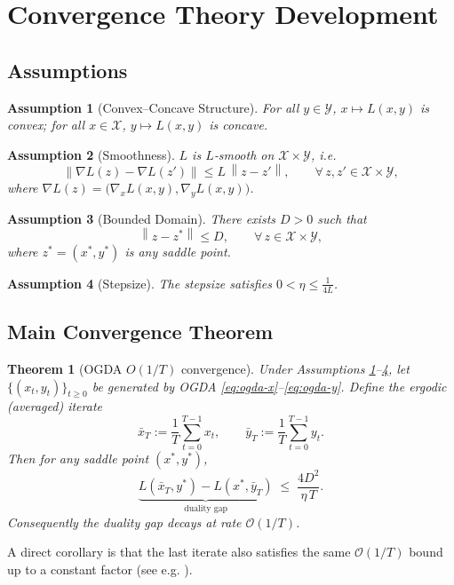\documentclass{article}
\newtheorem{theorem}{Theorem}
\newtheorem{assumption}{Assumption}
\newcommand{\norm}[1]{\left\|#1\right\|}
\begin{document}
\newpage
\section*{Convergence Theory Development}

\subsection*{Assumptions}
\begin{assumption}[Convex–Concave Structure]\label{ass:cc}
For all $y\in\mathcal{Y}$, $x\mapsto L(x,y)$ is convex;  
for all $x\in\mathcal{X}$, $y\mapsto L(x,y)$ is concave.
\end{assumption}
\begin{assumption}[Smoothness]\label{ass:smooth}
$L$ is $L$‑smooth on $\mathcal{X}\times\mathcal{Y}$, i.e.
\[
\norm{\nabla L(z)-\nabla L(z')}\le L\,\norm{z-z'},\qquad
\forall\,z,z'\in\mathcal{X}\times\mathcal{Y},
\]
where $\nabla L(z)=\bigl(\nabla_x L(x,y),\nabla_y L(x,y)\bigr)$.
\end{assumption}
\begin{assumption}[Bounded Domain]\label{ass:bounded}
There exists $D>0$ such that
\[
\norm{z-z^*}\le D,\qquad\forall\,z\in\mathcal{X}\times\mathcal{Y},
\]
where $z^*=(x^*,y^*)$ is any saddle point.
\end{assumption}
\begin{assumption}[Stepsize]\label{ass:stepsize}
The stepsize satisfies $0<\eta\le \frac{1}{4L}$.
\end{assumption}

\subsection*{Main Convergence Theorem}
\begin{theorem}[OGDA $O(1/T)$ convergence]\label{thm:ogda}
Under Assumptions \ref{ass:cc}–\ref{ass:stepsize}, let $\{(x_t,y_t)\}_{t\ge0}$ be generated by OGDA \eqref{eq:ogda-x}–\eqref{eq:ogda-y}.  
Define the \emph{ergodic} (averaged) iterate
\[
\bar x_T:=\frac{1}{T}\sum_{t=0}^{T-1}x_t,\qquad
\bar y_T:=\frac{1}{T}\sum_{t=0}^{T-1}y_t .
\]
Then for any saddle point $(x^*,y^*)$,
\[
\underbrace{L(\bar x_T,y^*)-L(x^*,\bar y_T)}_{\displaystyle \text{duality gap}}
\;\le\;
\frac{4D^{2}}{\eta\,T}.
\]
Consequently the duality gap decays at rate $\mathcal{O}(1/T)$.
\end{theorem}
A direct corollary is that the last iterate also satisfies the same $\mathcal{O}(1/T)$ bound up to a constant factor (see e.g. \cite{daskalakis2018training}).
\end{document}
